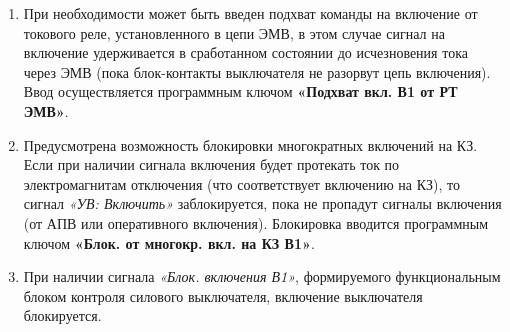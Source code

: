 \begin{enumerate}
\item
При необходимости может быть введен подхват команды на включение от токового реле, установленного в цепи ЭМВ, в этом случае сигнал на включение удерживается в сработанном состоянии до исчезновения тока через ЭМВ (пока блок-контакты выключателя не разорвут цепь включения). Ввод осуществляется программным ключом \textbf{«Подхват вкл. В1 от РТ ЭМВ»}. 

\item
Предусмотрена возможность блокировки многократных включений на КЗ. Если при наличии сигнала включения будет протекать ток по электромагнитам отключения (что соответствует включению на КЗ), то сигнал \textit{«УВ: Включить»} заблокируется, пока не пропадут сигналы включения (от АПВ или оперативного включения). Блокировка вводится программным ключом \textbf{«Блок. от многокр. вкл. на КЗ В1»}.

\item
При наличии сигнала \textit{«Блок. включения В1»}, формируемого функциональным блоком контроля силового выключателя, включение выключателя блокируется.


\end{enumerate}